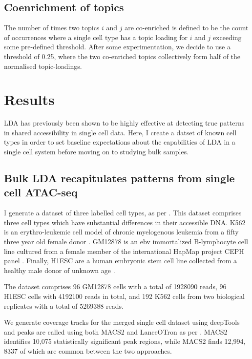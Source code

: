 \subsection{Coenrichment of topics}

The number of times two topics $i$ and $j$ are co-enriched is defined to be the count of occurrences where a single cell type has a topic loading for $i$ and $j$ exceeding some pre-defined threshold. After some experimentation, we decide to use a threshold of 0.25, where the two co-enriched topics collectively form half of the normalised topic-loadings. 

\section{Results} \label{ch4:results}

LDA has previously been shown to be highly effective at detecting true patterns in shared accessibility in single cell data. Here, I create a datset of known cell types in order to set baseline expectations about the capabilities of LDA in a single cell system before moving on to studying bulk samples.

\subsection{Bulk LDA recapitulates patterns from single cell ATAC-seq}

I generate a dataset of three labelled cell types, as per . This dataset comprises three cell types which have substantial differences in their accessible DNA.  K562 is an erythro-leukemic cell model of chronic myelogenous leukemia from a fifty three year old female donor \cite{Lozzio1975}. GM12878 is an \gls{ebv} immortalized B-lymphocyte cell line cultured from a female member of the international HapMap project CEPH panel \cite{Belmont2005}. Finally, H1ESC are a human embryonic stem cell line collected from a healthy male donor of unknown age \cite{Thomson1998}. 

The dataset comprises 96 GM12878 cells with a total of 1928090 reads, 96 H1ESC cells with 4192100 reads in total, and 192 K562 cells from two biological replicates with a total of 5269388 reads.

We generate coverage tracks for the merged single cell dataset using deepTools and peaks are called using both MACS2 and LanceOTron as per  \cite{Ramirez2014}. MACS2 identifies 10,075 statistically significant peak regions, while MACS2 finds 12,994, 8337 of which are common between the two approaches.  

